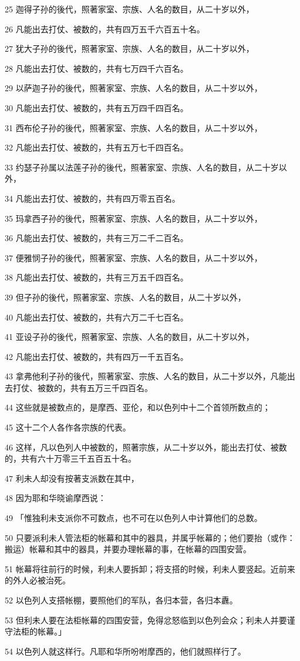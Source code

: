 \par 25 迦得子孙的後代，照著家室、宗族、人名的数目，从二十岁以外，
\par 26 凡能出去打仗、被数的，共有四万五千六百五十名。
\par 27 犹大子孙的後代，照著家室、宗族、人名的数目，从二十岁以外，
\par 28 凡能出去打仗、被数的，共有七万四千六百名。
\par 29 以萨迦子孙的後代，照著家室、宗族、人名的数目，从二十岁以外，
\par 30 凡能出去打仗、被数的，共有五万四千四百名。
\par 31 西布伦子孙的後代，照著家室、宗族、人名的数目，从二十岁以外，
\par 32 凡能出去打仗、被数的，共有五万七千四百名。
\par 33 约瑟子孙属以法莲子孙的後代，照著家室、宗族、人名的数目，从二十岁以外，
\par 34 凡能出去打仗、被数的，共有四万零五百名。
\par 35 玛拿西子孙的後代，照著家室、宗族、人名的数目，从二十岁以外，
\par 36 凡能出去打仗、被数的，共有三万二千二百名。
\par 37 便雅悯子孙的後代，照著家室、宗族、人名的数目，从二十岁以外，
\par 38 凡能出去打仗、被数的，共有三万五千四百名。
\par 39 但子孙的後代，照著家室、宗族、人名的数目，从二十岁以外，
\par 40 凡能出去打仗、被数的，共有六万二千七百名。
\par 41 亚设子孙的後代，照著家室、宗族、人名的数目，从二十岁以外，
\par 42 凡能出去打仗、被数的，共有四万一千五百名。
\par 43 拿弗他利子孙的後代，照著家室、宗族、人名的数目，从二十岁以外，凡能出去打仗、被数的，共有五万三千四百名。
\par 44 这些就是被数点的，是摩西、亚伦，和以色列中十二个首领所数点的；
\par 45 这十二个人各作各宗族的代表。
\par 46 这样，凡以色列人中被数的，照著宗族，从二十岁以外，能出去打仗、被数的，共有六十万零三千五百五十名。
\par 47 利未人却没有按著支派数在其中，
\par 48 因为耶和华晓谕摩西说：
\par 49 「惟独利未支派你不可数点，也不可在以色列人中计算他们的总数。
\par 50 只要派利未人管法柜的帐幕和其中的器具，并属乎帐幕的；他们要抬（或作：搬运）帐幕和其中的器具，并要办理帐幕的事，在帐幕的四围安营。
\par 51 帐幕将往前行的时候，利未人要拆卸；将支搭的时候，利未人要竖起。近前来的外人必被治死。
\par 52 以色列人支搭帐棚，要照他们的军队，各归本营，各归本纛。
\par 53 但利未人要在法柜帐幕的四围安营，免得忿怒临到以色列会众；利未人并要谨守法柜的帐幕。」
\par 54 以色列人就这样行。凡耶和华所吩咐摩西的，他们就照样行了。

